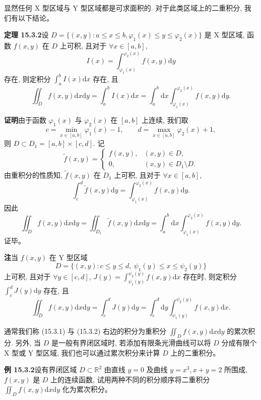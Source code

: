 \documentclass[UTF8,12pt,a4paper,fontset=fandol]{ctexart}
\begin{document}
显然任何 X 型区域与 Y 型区域都是可求面积的. 对于此类区域上的二重积分, 我们有以下结论。

\noindent\textbf{定理 15.3.2}\quad 设 $D=\{(x,y):a\leqslant x\leqslant b,\varphi_1(x)\leqslant y\leqslant\varphi_2(x)\}$ 是 X 型区域, 函数 $f(x,y)$ 在 $D$ 上可积, 且对于 $\forall x\in[a,b]$,
\[
  I(x)=\int_{\varphi_1(x)}^{\varphi_2(x)}f(x,y)\mathrm dy
\]
存在, 则定积分 $\int_a^b I(x)\mathrm dx$ 存在, 且
\begin{equation}
  \iint_D f(x,y)\mathrm dx\mathrm dy
  =\int_a^b I(x)\mathrm dx
  =\int_a^b\mathrm dx\int_{\varphi_1(x)}^{\varphi_2(x)}f(x,y)\mathrm dy.
  \tag{15.3.1}
\end{equation}

\noindent\textbf{证明}\quad 由于函数 $\varphi_1(x)$ 与 $\varphi_2(x)$ 在 $[a,b]$ 上连续, 我们取
\[
  c=\min_{x\in[a,b]}\varphi_1(x)-1,\qquad
  d=\max_{x\in[a,b]}\varphi_2(x)+1,
\]
则 $D\subset D_1=[a,b]\times[c,d]$. 记
\[
  \tilde f(x,y)=
  \begin{cases}
    f(x,y), & (x,y)\in D,\\
    0, & (x,y)\in D_1\setminus D.
  \end{cases}
\]
由重积分的性质知, $\tilde f(x,y)$ 在 $D_1$ 上可积, 且对于 $\forall x\in[a,b]$,
\[
  \int_c^d\tilde f(x,y)\mathrm dy
  =\int_{\varphi_1(x)}^{\varphi_2(x)}f(x,y)\mathrm dy.
\]
因此
\[
  \iint_D f(x,y)\mathrm dx\mathrm dy
  =\iint_{D_1}\tilde f(x,y)\mathrm dx\mathrm dy
  =\int_a^b\mathrm dx\int_{\varphi_1(x)}^{\varphi_2(x)}f(x,y)\mathrm dy.
\]
证毕。

\noindent\textbf{注}\quad 当 $f(x,y)$ 在 Y 型区域
\[
  D=\{(x,y):c\leqslant y\leqslant d,\ \psi_1(y)\leqslant x\leqslant\psi_2(y)\}
\]
上可积, 且对于 $\forall y\in[c,d]$, $J(y)=\int_{\psi_1(y)}^{\psi_2(y)}f(x,y)\mathrm dx$ 存在时, 则定积分 $\int_c^dJ(y)\mathrm dy$ 存在, 且
\begin{equation}
  \iint_D f(x,y)\mathrm dx\mathrm dy
  =\int_c^dJ(y)\mathrm dy
  =\int_c^d\mathrm dy\int_{\psi_1(y)}^{\psi_2(y)}f(x,y)\mathrm dx.
  \tag{15.3.2}
\end{equation}

通常我们称 (15.3.1) 与 (15.3.2) 右边的积分为重积分 $\iint_D f(x,y)\mathrm dx\mathrm dy$ 的累次积分. 另外, 当 $D$ 是一般有界闭区域时, 若添加有限条光滑曲线可以将 $D$ 分成有限个 X 型或 Y 型区域, 我们也可以通过累次积分来计算 $D$ 上的二重积分。

\noindent\textbf{例 15.3.2}\quad 设有界闭区域 $D\subset\mathbb R^2$ 由直线 $y=0$ 及曲线 $y=x^3,x+y=2$ 所围成, $f(x,y)$ 是 $D$ 上的连续函数, 试用两种不同的积分顺序将二重积分 $\iint_D f(x,y)\mathrm dx\mathrm dy$ 化为累次积分。
\end{document}
